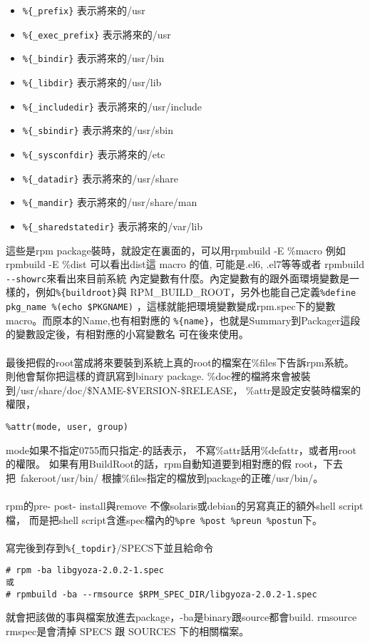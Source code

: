 \begin{itemize}
  \item \verb=%{_prefix}= 表示將來的/usr
  \item \verb=%{_exec_prefix}= 表示將來的/usr
  \item \verb=%{_bindir}= 表示將來的/usr/bin
  \item \verb=%{_libdir}= 表示將來的/usr/lib
  \item \verb=%{_includedir}= 表示將來的/usr/include
  \item \verb=%{_sbindir}= 表示將來的/usr/sbin
  \item \verb=%{_sysconfdir}= 表示將來的/etc
  \item \verb=%{_datadir}= 表示將來的/usr/share
  \item \verb=%{_mandir}= 表示將來的/usr/share/man
  \item \verb=%{_sharedstatedir}= 表示將來的/var/lib
\end{itemize}
這些是rpm package裝時，就設定在裏面的，可以用rpmbuild -E \%{macro} 例如
rpmbuild -E \%{dist} 可以看出dist這 macro 的值, 可能是.el6, .el7等等或者
rpmbuild \verb=--showrc=來看出來目前系統
內定變數有什麼。內定變數有的跟外面環境變數是一樣的，例如\verb=%{buildroot}=與
RPM\_BUILD\_ROOT，另外也能自己定義\verb=%define pkg_name %(echo $PKGNAME)=
，這樣就能把環境變數變成rpm.spec下的變數macro。而原本的Name,也有相對應的
\verb=%{name}=，也就是Summary到Packager這段的變數設定後，有相對應的小寫變數名
可在後來使用。
\\\\
最後把假的root當成將來要裝到系統上真的root的檔案在\%files下告訴rpm系統。
則他會幫你把這樣的資訊寫到binary package.
\%doc裡的檔將來會被裝到/usr/share/doc/\$NAME-\$VERSION-\$RELEASE，
\%attr是設定安裝時檔案的權限，
\begin{verbatim}
%attr(mode, user, group)
\end{verbatim}
mode如果不指定0755而只指定-的話表示， 不寫\%attr話用\%defattr，或者用root的權限。
如果有用BuildRoot的話，rpm自動知道要到相對應的假 root，下去把~fakeroot/usr/bin/
根據\%files指定的檔放到package的正確/usr/bin/。 
\\\\
rpm的pre- post- install與remove 不像solaris或debian的另寫真正的額外shell script檔，
而是把shell script含進spec檔內的\verb=%pre %post %preun %postun=下。
\\\\
寫完後到存到\verb=%{_topdir}=/SPECS下並且給命令
\begin{verbatim}
# rpm -ba libgyoza-2.0.2-1.spec
或
# rpmbuild -ba --rmsource $RPM_SPEC_DIR/libgyoza-2.0.2-1.spec
\end{verbatim}
就會把該做的事與檔案放進去package，-ba是binary跟source都會build.
rmsource rmspec是會清掉 SPECS 跟 SOURCES 下的相關檔案。

